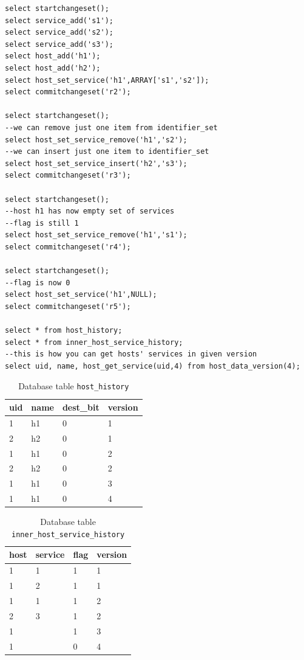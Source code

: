 \documentclass[deska]{subfiles}
\begin{document}
\begin{verbatim}
select startchangeset();
select service_add('s1');
select service_add('s2');
select service_add('s3');
select host_add('h1');
select host_add('h2');
select host_set_service('h1',ARRAY['s1','s2']);
select commitchangeset('r2');

select startchangeset();
--we can remove just one item from identifier_set
select host_set_service_remove('h1','s2');
--we can insert just one item to identifier_set
select host_set_service_insert('h2','s3');
select commitchangeset('r3');

select startchangeset();
--host h1 has now empty set of services
--flag is still 1
select host_set_service_remove('h1','s1');
select commitchangeset('r4');

select startchangeset();
--flag is now 0
select host_set_service('h1',NULL);
select commitchangeset('r5');

select * from host_history;
select * from inner_host_service_history;
--this is how you can get hosts' services in given version
select uid, name, host_get_service(uid,4) from host_data_version(4);
\end{verbatim}

\begin{longtable}{ l | l | l | l }
    \caption{Database table {\tt host\_history}}
    \label{tab:multi-hosthist} \\
    uid & name & dest\_bit & version\\
    \hline
    \endhead
    1 & h1 & 0 & 1\\
    2 & h2 & 0 & 1\\
    1 & h1 & 0 & 2\\
    2 & h2 & 0 & 2\\
    1 & h1 & 0 & 3\\
    1 & h1 & 0 & 4\\
    \hline
\end{longtable}

\begin{longtable}{ l | l | l | l }
    \caption{Database table {\tt inner\_host\_service\_history}}
    \label{tab:multi-innerhist} \\
    host & service & flag & version\\
    \hline
    \endhead
    1 & 1 & 1 & 1\\
    1 & 2 & 1 & 1\\
    1 & 1 & 1 & 2\\
    2 & 3 & 1 & 2\\
    1 &  & 1 & 3\\
    1 &  & 0 & 4\\
    \hline
\end{longtable}
\end{document}
